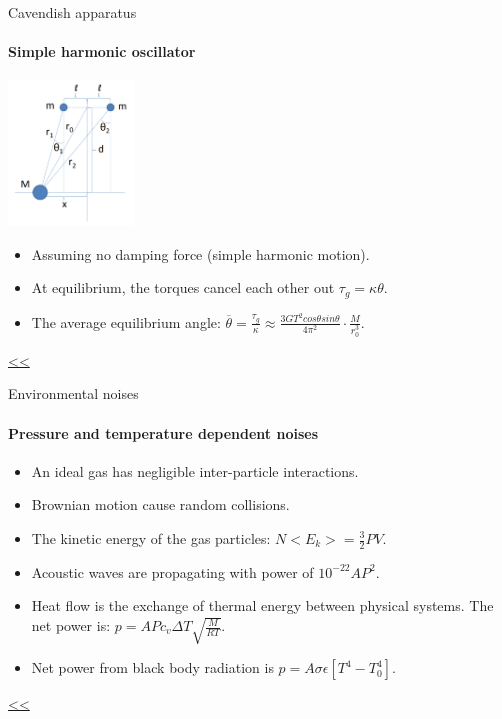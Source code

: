 \documentclass{beamer}
\begin{document}
\begin{frame}{Cavendish apparatus}
	\framesubtitle{Simple harmonic oscillator}
	\begin{center}		
		\includegraphics[width=0.25\textwidth,keepaspectratio]{Cavendish apparatus.PNG}
    \end{center}
	\begin{itemize}
		\item Assuming no damping force (simple harmonic motion).
		\item At equilibrium, the torques cancel each other out $\tau_g =  \kappa\theta$.
		\item The average equilibrium angle: $\overline{\theta} = \frac{\tau_g}{\kappa} \approx \frac{3GT^2cos\theta sin\theta}{4\pi^2 } \cdot \frac{M}{r_0^3}$.
		
	\end{itemize}
	\hyperlink{frame:Cavendish apparatus}{<<} 

\end{frame}

\begin{frame}{\hypertarget{frame:Environmental noises 1}{Environmental noises}}
	\framesubtitle{Pressure and temperature dependent noises}
	\begin{itemize}
		\item An ideal gas has negligible inter-particle interactions.
		\item Brownian motion cause random collisions. 
		\item The kinetic energy of the gas particles: $ N<E_k> = \frac{3}{2} PV$.
		\item Acoustic waves are propagating with power of $10^{-22}AP^2$.
		\item Heat flow is the exchange of thermal energy between physical systems. The net power is: $p= A P c_v \Delta T \sqrt{\frac{M}{RT}} $.
		\item Net power from black body radiation is $p= A \sigma\epsilon[ T^4- T_0^4]$.
		
	\end{itemize}
	\hyperlink{frame:Environmental noises}{<<} 
\end{frame}
\end{document}

